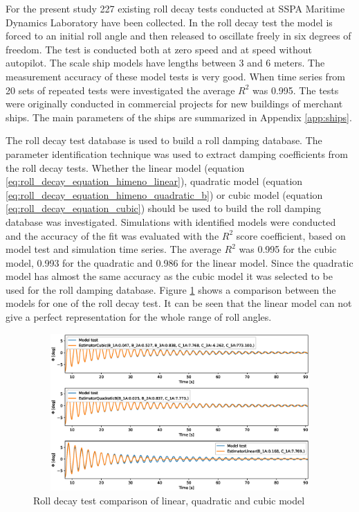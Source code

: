 For the present study 227 existing roll decay tests conducted at SSPA Maritime Dynamics Laboratory have been collected. In the roll decay test the model is forced to an initial roll angle and then released to oscillate freely in six degrees of freedom. The test is conducted both at zero speed and at speed without autopilot. The scale ship models have lengths between 3 and 6 meters. The measurement accuracy of these model tests is very good. When time series from 20 sets of repeated tests were investigated the average $R^2$ was 0.995. The tests were originally conducted in commercial projects for new buildings of merchant ships. The main parameters of the ships are summarized in Appendix \ref{app:ships}. 

The roll decay test database is used to build a roll damping database. The parameter identification technique was used to extract damping coefficients from the roll decay tests. Whether the linear model (equation \ref{eq:roll_decay_equation_himeno_linear}), quadratic model (equation \ref{eq:roll_decay_equation_himeno_quadratic_b}) or cubic model (equation \ref{eq:roll_decay_equation_cubic}) should be used to build the roll damping database was investigated. Simulations with identified models were conducted and the accuracy of the fit was evaluated with the $R^2$ score coefficient, based on model test and simulation time series.
The average $R^2$ was 0.995 for the cubic model, 0.993 for the quadratic and 0.986 for the linear model. Since the quadratic model has almost the same accuracy as the cubic model it was selected to be used for the roll damping database. Figure \ref{fig:roll_decay_model_compare} shows a comparison between the models for one of the roll decay test. It can be seen that the linear model can not give a perfect representation for the whole range of roll angles.

\begin{figure}[H]
    \centering
    \includegraphics[width=12cm, height = 6cm ]{figures/roll_decay_model_compare.eps}
    \caption{Roll decay test comparison of linear, quadratic and cubic model}
    \label{fig:roll_decay_model_compare}
\end{figure}

